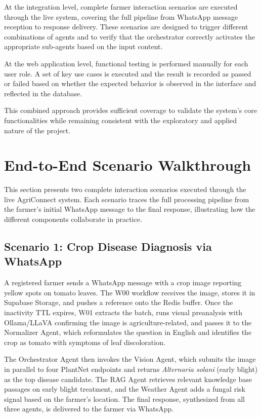 At the integration level, complete farmer interaction scenarios are executed through the live system, covering the full pipeline from WhatsApp message reception to response delivery. These scenarios are designed to trigger different combinations of agents and to verify that the orchestrator correctly activates the appropriate sub-agents based on the input content.

At the web application level, functional testing is performed manually for each user role. A set of key use cases is executed and the result is recorded as passed or failed based on whether the expected behavior is observed in the interface and reflected in the database.

This combined approach provides sufficient coverage to validate the system's core functionalities while remaining consistent with the exploratory and applied nature of the project.

\section{End-to-End Scenario Walkthrough}

This section presents two complete interaction scenarios executed through the live AgriConnect system. Each scenario traces the full processing pipeline from the farmer's initial WhatsApp message to the final response, illustrating how the different components collaborate in practice.

\subsection{Scenario 1: Crop Disease Diagnosis via WhatsApp}

A registered farmer sends a WhatsApp message with a crop image reporting yellow spots on tomato leaves. The W00 workflow receives the image, stores it in Supabase Storage, and pushes a reference onto the Redis buffer. Once the inactivity TTL expires, W01 extracts the batch, runs visual preanalysis with Ollama/LLaVA confirming the image is agriculture-related, and passes it to the Normalizer Agent, which reformulates the question in English and identifies the crop as tomato with symptoms of leaf discoloration.

The Orchestrator Agent then invokes the Vision Agent, which submits the image in parallel to four PlantNet endpoints and returns \textit{Alternaria solani} (early blight) as the top disease candidate. The RAG Agent retrieves relevant knowledge base passages on early blight treatment, and the Weather Agent adds a fungal risk signal based on the farmer's location. The final response, synthesized from all three agents, is delivered to the farmer via WhatsApp.

